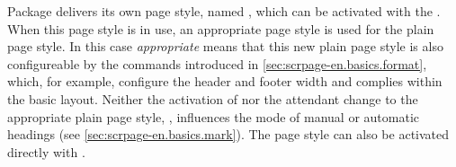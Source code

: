 \begin{Declaration}
\end{Declaration}%
Package  delivers its own page style, named
, which can be activated with the
. When this page style is in use, an
appropriate  page style is used for the plain page style.
In this case \emph{appropriate} means that this new plain page style is also
configureable by the commands introduced in
\autoref{sec:scrpage-en.basics.format}, which, for example, configure the header
and footer width and complies within the basic layout. Neither the activation
of  nor the attendant change to the appropriate plain
page style, , influences the mode of manual or automatic
headings (see
\autoref{sec:scrpage-en.basics.mark}). The  page style can
also be activated directly with .


